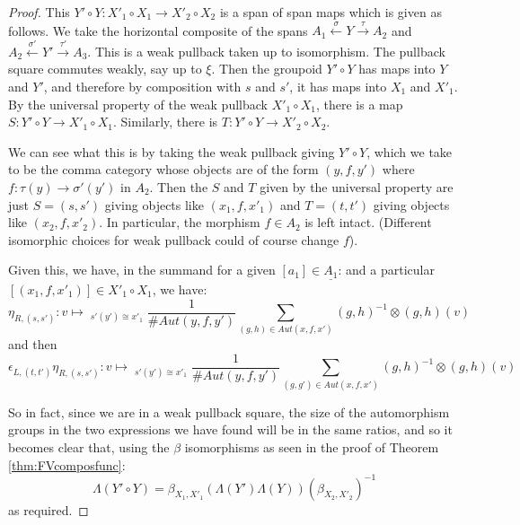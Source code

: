 \documentclass[10pt]{amsart}
\numberwithin{theorem}{subsection}
\newcommand{\ra}{\mathop{\rightarrow}}
\newcommand{\la}{\mathop{\leftarrow}}
\newcommand{\FV}{\Lambda}
\begin{document}
\begin{proof}
This $Y' \circ Y : {X'}_1 \circ X_1 \ra {X'}_2 \circ X_2$ is a span of
span maps which is given as follows.  We take the horizontal composite
of the spans $A_1 \stackrel{\sigma}{\la} Y \stackrel{\tau}{\ra} A_2$
and $A_2 \stackrel{\sigma '}{\la} Y' \stackrel{\tau '}{\ra} A_3$.
This is a weak pullback taken up to isomorphism.  The pullback square
commutes weakly, say up to $\xi$.  Then the groupoid $Y' \circ Y$ has
maps into $Y$ and $Y'$, and therefore by composition with $s$ and
$s'$, it has maps into $X_1$ and ${X'}_1$.  By the universal property
of the weak pullback ${X'}_1 \circ X_1$, there is a map $S : Y' \circ
Y \ra {X'}_1 \circ X_1$.  Similarly, there is $T : Y' \circ Y \ra
{X'}_2 \circ X_2$.

We can see what this is by taking the weak pullback giving $Y' \circ
Y$, which we take to be the comma category whose objects are of the
form $(y,f,y')$ where $f : \tau(y) \ra \sigma '(y')$ in $A_2$.  Then
the $S$ and $T$ given by the universal property are just $S = (s,s')$
giving objects like $(x_1,f,{x'}_1)$ and $T = (t,t')$ giving objects
like $(x_2,f,{x'}_2)$.  In particular, the morphism $f \in A_2$ is
left intact.  (Different isomorphic choices for weak pullback could of
course change $f$).

Given this, we have, in the summand for a given $[a_1] \in \underline{A_1}$:
and a particular $[(x_1,f,x'_1)] \in X'_1 \circ X_1$, we have:
\begin{equation}
\eta_{R,(s,s')} : v \mapsto \mathop{\bigoplus_{\stackrel{[y,f,y']}{s(y) \cong x_1}}}_{s'(y') \cong x'_1} \frac{1}{\# Aut(y,f,y')} \sum_{(g,h) \in Aut(x,f,x')} (g,h)^{-1} \otimes (g,h)(v)
\end{equation}
and then
\begin{equation}
\epsilon_{L,(t,t')} \eta_{R,(s,s')} : v \mapsto \mathop{\sum_{\stackrel{[y,f,y']}{s(y) \cong x_1}}}_{s'(y') \cong x'_1}  \frac{1}{\# Aut(y,f,y')} \sum_{(g,g') \in Aut(x,f,x')} (g,h)^{-1} \otimes (g,h)(v)
\end{equation}

So in fact, since we are in a weak pullback square, the size of the automorphism groups in the two expressions we have found will be in the same ratios, and so it becomes clear that, using the $\beta$ isomorphisms as seen in the proof of Theorem \ref{thm:FVcomposfunc}:
\begin{equation}
\FV(Y' \circ Y) = \beta_{X_1,{X'}_1} (\FV(Y') \FV(Y)) (\beta_{X_2,{X'}_2})^{-1}
\end{equation}
as required.
\end{proof}
\end{document}

